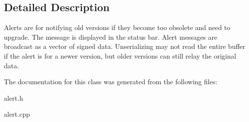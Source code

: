 \subsection{Detailed Description}
Alerts are for notifying old versions if they become too obsolete and need to upgrade. The message is displayed in the status bar. Alert messages are broadcast as a vector of signed data. Unserializing may not read the entire buffer if the alert is for a newer version, but older versions can still relay the original data. 

The documentation for this class was generated from the following files\+:\begin{DoxyCompactItemize}
\item 
alert.\+h\item 
alert.\+cpp\end{DoxyCompactItemize}
